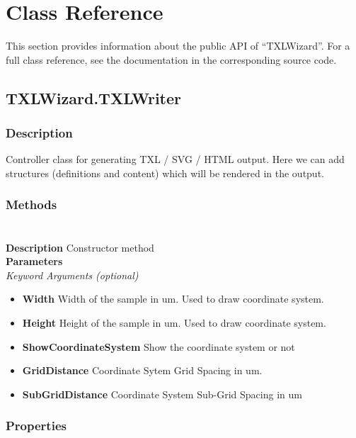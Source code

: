 \section{Class Reference}
    This section provides information about the public API of ``TXLWizard''.
    For a full class reference, see the documentation in the corresponding source code.
    \subsection{TXLWizard.TXLWriter}
        \subsubsection{Description}
            Controller class for generating TXL / SVG / HTML output.
            Here we can add structures (definitions and content) which will be rendered in the output.
        \subsubsection{Methods}
            \paragraph{}\mbox{}\\
                \textbf{Description} Constructor method \\
                \textbf{Parameters} \\
                    \textit{Keyword Arguments (optional)}
                    \begin{itemize}
                        \item \textbf{Width}  Width of the sample in um. Used to draw coordinate system.
                        \item \textbf{Height}  Height of the sample in um. Used to draw coordinate system.
                        \item \textbf{ShowCoordinateSystem}  Show the coordinate system or not
                        \item \textbf{GridDistance}  Coordinate Sytem Grid Spacing in um.
                        \item \textbf{SubGridDistance}  Coordinate System Sub-Grid Spacing in um
                    \end{itemize}
        \subsubsection{Properties}
